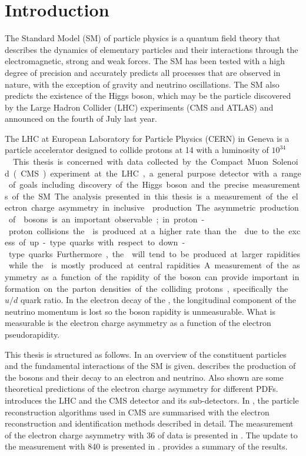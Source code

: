 \chapter{Introduction}
\label{chap:introduction}

The Standard Model (SM) of particle physics is a quantum field theory that
describes the dynamics of elementary particles and their interactions through
the electromagnetic, strong and weak forces. The {SM} has been tested with a
high degree of precision and accurately predicts all processes that are observed
in nature, with the exception of gravity and neutrino oscillations. The {SM}
also predicts the existence of the Higgs boson, which may be the particle
discovered by the Large Hadron Collider (LHC) experiments ({CMS} and {ATLAS}) and announced on the
fourth of July last year\cite{chatrchyan2012observation,aad2012observation}.

The LHC at European Laboratory for Particle Physics
(CERN) in Geneva is a particle accelerator designed to collide protons at
\unit{14}{\TeV} with a luminosity of \unit{$10^{34}$}{\lumiunits}. This thesis
is concerned with data collected by the Compact Muon Solenoid (CMS) experiment at
the {LHC}, a general purpose detector with a range of goals including discovery
of the Higgs boson and the precise measurements of the {SM}.

The analysis presented in this thesis is a measurement of the electron charge
asymmetry in inclusive \PW production. The asymmetric production of \PW bosons
is an important observable; in proton-proton collisions the \PWp is  produced at
a higher rate than the \PWm due to the excess of up-type quarks with respect to
down-type quarks. Furthermore, the \PWp will tend to be produced at larger
rapidities while the \PWm is mostly produced at central rapidities. A
measurement of the asymmetry as a function of the rapidity of the boson can
provide important information on the parton densities of the colliding protons,
specifically the ${u}/{d}$ quark ratio.  In the electron decay of the
\PW, the longitudinal component of the neutrino momentum is lost so the boson
rapidity is unmeasurable. What is measurable is the electron charge asymmetry as
a function of the electron pseudorapidity. 

This thesis is structured as follows. In  an overview of the
constituent particles  and the fundamental interactions of the {SM} is given.
 describes the production of the \PW bosons and their
decay to an electron and neutrino. Also shown are some theoretical predictions
of the electron charge asymmetry for different PDFs.  
introduces the {LHC} and the {CMS} detector and its sub-detectors.  In
, the particle reconstruction algorithms used in CMS
are summarised with the electron reconstruction and identification methods
described in detail. The measurement of the electron charge asymmetry with
\unit{36}{\invpb} of data is presented in . The update
to the measurement with \unit{840}{\invpb} is presented in
.  provides a summary of
the results.




